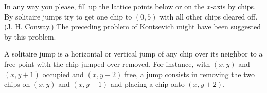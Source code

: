 In any way you please, fill up the lattice points below or on the $x$-axis by chips. By solitaire jumps try to get one chip to $(0, 5)$ with all other chips cleared off. (J. H. Conway.) The preceding problem of Kontsevich might have been suggested by this problem.

A solitaire jump is a horizontal or vertical jump of any chip over its neighbor to a free point with the chip jumped over removed. For instance, with $(x, y)$ and $(x, y + 1)$ occupied and $(x, y + 2)$ free, a jump consists in removing the two chips on $(x, y)$ and $(x, y + 1)$ and placing a chip onto $(x, y + 2)$.

